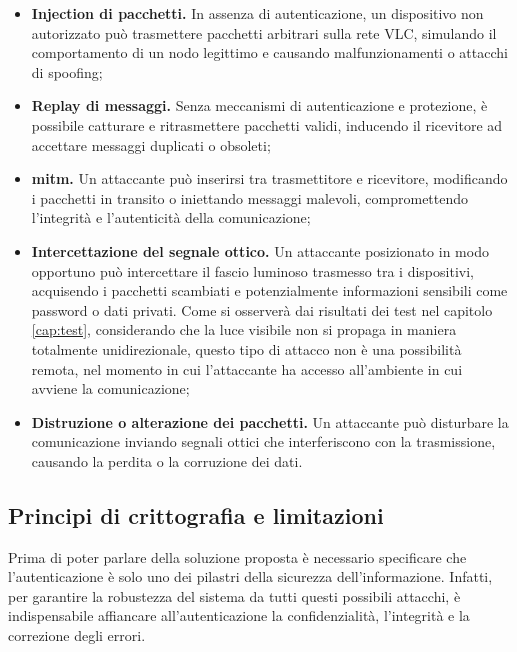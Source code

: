 \begin{itemize}
    \item \textbf{Injection di pacchetti.} In assenza di autenticazione, un dispositivo non autorizzato può trasmettere pacchetti arbitrari sulla rete VLC, simulando il comportamento di un nodo legittimo e causando malfunzionamenti o attacchi di spoofing;
    \item \textbf{Replay di messaggi.} Senza meccanismi di autenticazione e protezione, è possibile catturare e ritrasmettere pacchetti validi, inducendo il ricevitore ad accettare messaggi duplicati o obsoleti;
    \item \textbf{\gls{mitm}.} Un attaccante può inserirsi tra trasmettitore e ricevitore, modificando i pacchetti in transito o iniettando messaggi malevoli, compromettendo l'integrità e l'autenticità della comunicazione;
    \item \textbf{Intercettazione del segnale ottico.} Un attaccante posizionato in modo opportuno può intercettare il fascio luminoso trasmesso tra i dispositivi, acquisendo i pacchetti scambiati e potenzialmente informazioni sensibili come password o dati privati. Come si osserverà dai risultati dei test nel capitolo \ref{cap:test}, considerando che la luce visibile non si propaga in maniera totalmente unidirezionale, questo tipo di attacco non è una possibilità remota, nel momento in cui l'attaccante ha accesso all'ambiente in cui avviene la comunicazione;
    \item \textbf{Distruzione o alterazione dei pacchetti.} Un attaccante può disturbare la comunicazione inviando segnali ottici che interferiscono con la trasmissione, causando la perdita o la corruzione dei dati.
\end{itemize}

\subsection{Principi di crittografia e limitazioni}
Prima di poter parlare della soluzione proposta è necessario specificare che l'autenticazione è solo uno dei pilastri della sicurezza dell'informazione. Infatti, per garantire la robustezza del sistema da tutti questi possibili attacchi, è indispensabile affiancare all'autenticazione la confidenzialità, l'integrità e la correzione degli errori.

